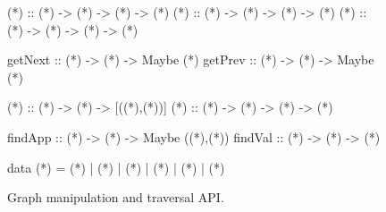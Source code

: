 \begin{figure}[t]
\centering
\begin{mcode}
 (*\putBefore*) :: (*\vstate*) -> (*\expr*) -> (*\expr*) -> (*\vstate*)
 (*\putAfter*)  :: (*\vstate*) -> (*\expr*) -> (*\expr*) -> (*\vstate*)
 (*\putRoot*)   :: (*\vstate*) -> (*\expr*) -> (*\expr*) -> (*\vstate*)

 getNext   :: (*\vstate*) -> (*\expr*) -> Maybe (*\expr*)
 getPrev   :: (*\vstate*) -> (*\expr*) -> Maybe (*\expr*)

 (*\getSubterms*) :: (*\vstate*) -> (*\expr*) -> [((*\expr*),(*\ctx*))]
 (*\applyCtx*)    :: (*\vstate*) -> (*\expr*) -> (*\ctx*) -> (*\expr*)
 
 findApp :: (*\vstate*) -> (*\expr*) -> Maybe ((*\expr*),(*\ctx*))
 findVal :: (*\vstate*) -> (*\expr*) -> (*\expr*)
 
 data (*\cmd*) = (*\stepforwardc*) | (*\stepbackwardc*)
          | (*\jumpforwardc*) | (*\jumpbackwardc*)
          | (*\stepoverc*)    | (*\stepintoc*)
\end{mcode}
\caption{Graph manipulation and traversal API.}
\label{fig:graph-api}
\end{figure}
